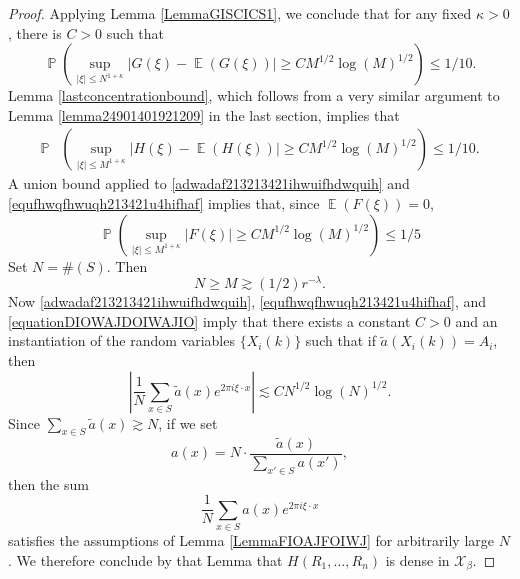 \documentclass[dvipsnames,letterpaper,12pt]{article}
\numberwithin{equation}{section}
\numberwithin{theorem}{section}
\DeclareMathOperator{\EE}{\mathbb{E}}
\DeclareMathOperator{\PP}{\mathbb{P}}
\begin{document}
\begin{proof}
    Applying Lemma \ref{LemmaGISCICS1}, we conclude that for any fixed $\kappa > 0$, there is $C > 0$ such that
    \begin{equation} \label{adwadaf213213421ihwuifhdwquih}
        \PP \left( \sup_{|\xi| \leq N^{1 + \kappa}} |G(\xi) - \EE(G(\xi))| \geq C M^{1/2} \log(M)^{1/2} \right) \leq 1/10.
    \end{equation}
    Lemma \ref{lastconcentrationbound}, which follows from a very similar argument to Lemma \ref{lemma24901401921209} in the last section, implies that
    \begin{equation} \label{equfhwqfhwuqh213421u4hifhaf}
    \begin{split}
        \PP & \left( \sup_{|\xi| \leq M^{1 + \kappa}} | H(\xi) - \EE(H(\xi)) | \geq C M^{1/2} \log(M)^{1/2} \right) \leq 1/10.
    \end{split}
    \end{equation}
    A union bound applied to \eqref{adwadaf213213421ihwuifhdwquih} and \eqref{equfhwqfhwuqh213421u4hifhaf} implies that, since $\EE(F(\xi)) = 0$,
    \begin{equation}
        \PP \left( \sup_{|\xi| \leq M^{1 + \kappa}} | F(\xi) | \geq C M^{1/2} \log(M)^{1/2} \right) \leq 1/5
    \end{equation}
    Set $N = \#(S)$. Then
    \begin{equation} \label{equationDIOWAJDOIWAJIO}
        N \geq M \gtrsim (1/2) r^{-\lambda}.
    \end{equation}
    Now \eqref{adwadaf213213421ihwuifhdwquih}, \eqref{equfhwqfhwuqh213421u4hifhaf}, and \eqref{equationDIOWAJDOIWAJIO} imply that there exists a constant $C > 0$ and an instantiation of the random variables $\{ X_i(k) \}$ such that if $\tilde{a}(X_i(k)) = A_i$, then
    \begin{equation} \label{equationdIOJAWOidjawodij1243123}
        \left| \frac{1}{N} \sum_{x \in S} \tilde{a}(x) e^{2 \pi i \xi \cdot x} \right| \lesssim C N^{1/2} \log(N)^{1/2}.
    \end{equation}
    Since $\sum_{x \in S} \tilde{a}(x) \gtrsim N$, if we set
    \[ a(x) = N \cdot \frac{\tilde{a}(x)}{\sum_{x' \in S} a(x')}, \]
    then the sum
    \[ \frac{1}{N} \sum_{x \in S} a(x) e^{2 \pi i \xi \cdot x} \]
    satisfies the assumptions of Lemma \ref{LemmaFIOAJFOIWJ} for arbitrarily large $N$. We therefore conclude by that Lemma that $H(R_1,\dots,R_n)$ is dense in $\mathcal{X}_\beta$.
\end{proof}
\end{document}
